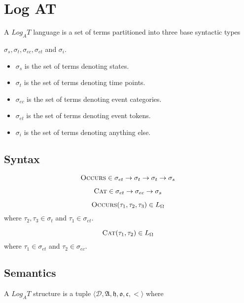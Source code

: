 \chapter{Log AT}

A $Log_A T$ language is a set of terms partitioned into three base syntactic types

$\sigma_s, \sigma_t, \sigma_{ec}, \sigma_{et}$ and $ \sigma_i$.

\begin{itemize}
	\item $\sigma_s$ is the set of terms denoting states.
	\item $\sigma_t$ is the set of terms denoting time points.
	\item $\sigma_{ec}$ is the set of terms denoting event categories.
	\item $\sigma_{et}$ is the set of terms denoting event tokens.
	\item $\sigma_i$ is the set of terms denoting anything else.
\end{itemize}


\section{Syntax}
\[
	\textsc{Occurs} \in \sigma_{et} \to \sigma_t \to \sigma_t \to \sigma_s
\]

\[
	\textsc{Cat} \in \sigma_{et} \to \sigma_{ec} \to \sigma_s
\]

\[
	\textsc{Occurs}(\tau_1, \tau_2, \tau_3) \in L_{\Omega}
\]
where $\tau_2, \tau_3 \in \sigma_t$  and $\tau_1 \in \sigma_{et}$.

\[
	\textsc{Cat}(\tau_1, \tau_2) \in L_{\Omega}
\]
where $\tau_1 \in \sigma_{et}$ and $\tau_2 \in \sigma_{ec}$.

\pagebreak
\section{Semantics}

\begin{defn}
	A $Log_AT$ structure is a tuple $\langle \mathcal{D},\mathfrak{A}, \mathfrak{h}, \mathfrak{o}, \mathfrak{c}, <
		\rangle$ where
\end{defn}

